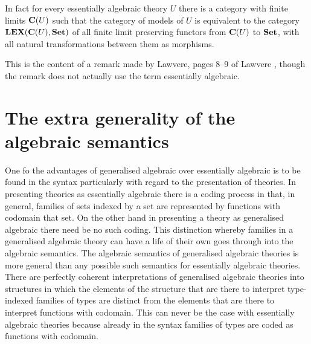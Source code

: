 In fact for every essentially algebraic theory $U$ there is a category with finite limits $\mathbf{C}(U)$ such that the category of models of $U$ is equivalent to the category $\mathbf{LEX}(\mathbf{C}(U),\mathbf{Set})$ of all finite limit preserving functors from $\mathbf{C}(U)$ to $\mathbf{Set}$, with all natural transformations between them as morphisms.

This is the content of a remark made by Lawvere, pages 8--9 of Lawvere \cite{17:lawvere}, though the remark does not actually use the term essentially algebraic.

\section{The extra generality of the algebraic semantics} \label{sec:source-1-5}
One fo the advantages of generalised algebraic over essentially algebraic is to be found in the syntax particularly with regard to the presentation of theories.
%
In presenting theories as essentially algebraic there is a coding process in that, in general, families of sets indexed by a set are represented by functions with codomain that set.
%
On the other hand in presenting a theory as generalised algebraic there need be no such coding.
%
This distinction whereby families in a generalised algebraic theory can have a life of their own goes through into the algebraic semantics.
%
The algebraic semantics of generalised algebraic theories is more general than any possible such semantics for essentially algebraic theories.
%
There are perfectly coherent interpretations of generalised algebraic theories into structures in which the elements of the structure that are there to interpret type-indexed families of types are distinct from the elements that are there to interpret functions with codomain.
%
This can never be the case with essentially algebraic theories because already in the syntax families of types are coded as functions with codomain.

